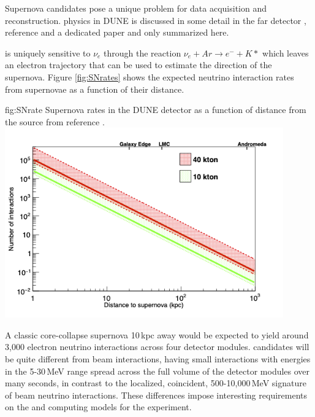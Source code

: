 \documentclass[../main-v1.tex]{subfiles}
\begin{document}
Supernova candidates pose a unique problem for data acquisition and reconstruction.   physics in DUNE is discussed in some detail in the far detector \cite{ Abi:2020evt}, reference \cite{Cuesta:2020dy} and a dedicated paper \cite{DUNE:2020zfm} and only summarized here. 

 is uniquely sensitive to $\nu_e$ through the reaction $\nu_e + Ar \rightarrow e^- + K*$ which leaves an electron trajectory that can be used to estimate the direction of the supernova.  Figure \ref{fig:SNrates} shows the expected neutrino interaction rates from supernovae as a function of their distance.

\begin{dunefigure}
{fig:SNrate}
{Supernova rates in the DUNE detector  as a function of distance from the source from reference \cite{DUNE:2020zfm}.}
{\includegraphics[width=0.9\textwidth]{graphics/IntroFigures/argon_sn.png}}
\end{dunefigure}

A classic core-collapse supernova 10\,kpc away would be expected to yield around 3,000   electron neutrino interactions across four detector modules.  candidates will be quite different from beam interactions, having small interactions with energies in the 5-30\,MeV range spread across the full volume of the detector modules over many seconds, in contrast to the localized, coincident,  500-10,000\,MeV signature of beam neutrino interactions. These differences impose interesting requirements on the  and computing models for the experiment.  
\end{document}
